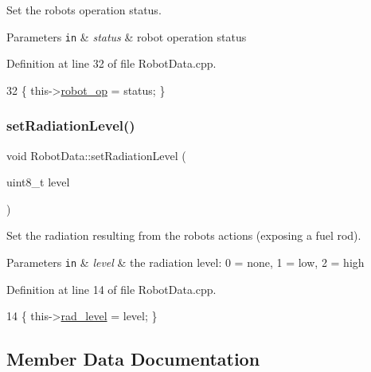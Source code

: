 Set the robot\textquotesingle{}s operation status. 


\begin{DoxyParams}[1]{Parameters}
\mbox{\tt in}  & {\em status} & robot operation status \\
\hline
\end{DoxyParams}


Definition at line 32 of file Robot\+Data.\+cpp.


\begin{DoxyCode}
32 \{ this->\hyperlink{class_robot_data_aa8c48e89aac7db2af1db825a7f3c1f30}{robot\_op} = status; \}
\end{DoxyCode}
\mbox{\label{class_robot_data_a330b0e4fa0303df4a16b8c07e917c622}} 
\subsubsection{\texorpdfstring{set\+Radiation\+Level()}{setRadiationLevel()}}
{\footnotesize\ttfamily void Robot\+Data\+::set\+Radiation\+Level (\begin{DoxyParamCaption}\item[{uint8\+\_\+t}]{level }\end{DoxyParamCaption})}



Set the radiation resulting from the robots actions (exposing a fuel rod). 


\begin{DoxyParams}[1]{Parameters}
\mbox{\tt in}  & {\em level} & the radiation level\+: 0 = none, 1 = low, 2 = high \\
\hline
\end{DoxyParams}


Definition at line 14 of file Robot\+Data.\+cpp.


\begin{DoxyCode}
14 \{ this->\hyperlink{class_robot_data_ad41288ab1056c14560356bf1a3e0a652}{rad\_level} = level; \}
\end{DoxyCode}


\subsection{Member Data Documentation}
\mbox{\label{class_robot_data_ad41288ab1056c14560356bf1a3e0a652}} 
